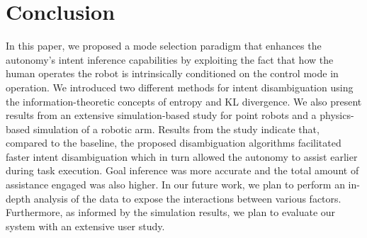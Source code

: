 \documentclass[letterpaper, 10 pt, conference]{ieeeconf}  %
\begin{document}

\section{Conclusion}\label{sec:conclusions}
 In this paper, we proposed a mode selection
paradigm that enhances the autonomy's intent inference capabilities by exploiting the fact that how the human operates the robot is intrinsically conditioned on the control mode in operation. We introduced two different methods for intent disambiguation using the information-theoretic concepts of entropy and KL divergence. We also present results from an extensive simulation-based study for point robots and a physics-based simulation of a robotic arm. Results from the study indicate that, compared to the baseline, the proposed disambiguation algorithms facilitated faster intent disambiguation which in turn allowed the autonomy to assist earlier during task execution. Goal inference was more accurate and the total amount of assistance engaged was also higher. In our future work, we plan to perform an in-depth analysis of the data to expose the interactions between various factors. Furthermore, as informed by the simulation results, we plan to evaluate our system with an extensive user study. 


\balance	


\end{document}
